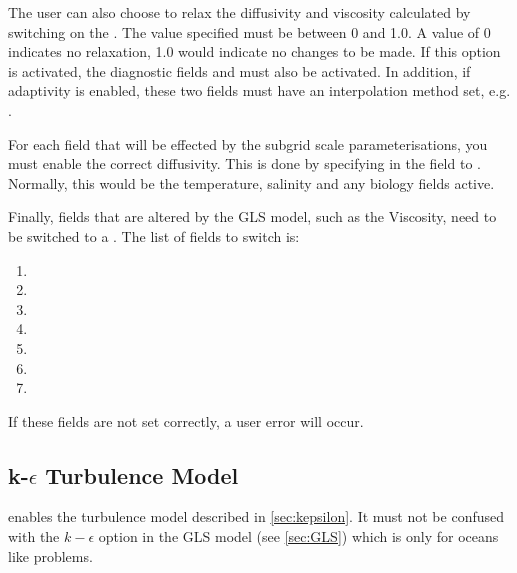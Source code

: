 The user can also choose to relax the diffusivity and viscosity calculated by switching on the\linebreak
{}. The value specified must be between 0 and 1.0. A value of 0 indicates
no relaxation, 1.0 would indicate no changes to be made. If this option is activated, the diagnostic fields
 and  must also
be activated. In addition, if adaptivity is enabled, these two fields must have an interpolation
method set, e.g. .

For each field that will be effected by the subgrid scale parameterisations, 
you must enable the correct diffusivity. This
is done by specifying  in the
field to . Normally, this would be the temperature, salinity and any biology fields active.

Finally, fields that are altered by the GLS model, such as the Viscosity, need to be switched
to a . The list of fields to switch is:
\begin{enumerate}
\item {}
\item {}
\item {}
\item {}
\item {}
\item {}
\item {}
\end{enumerate}

If these fields are not set correctly, a user error will occur.

\subsection{k-$\epsilon$ Turbulence Model}\label{sec:kepsilon_usage}

 enables the turbulence model
described in \ref{sec:kepsilon}. It must not be confused with the $k-\epsilon$ option in
the GLS model (see \ref{sec:GLS}) which is only for oceans like problems.

